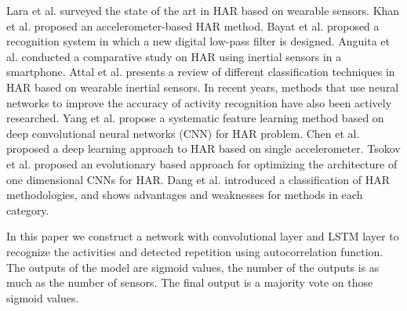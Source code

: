 \documentclass[graybox]{svmult}
\begin{document}
Lara et al.\cite{lara2012survey} surveyed  the state of the art in HAR based on wearable sensors.
Khan et al.\cite{khan2010triaxial} proposed an accelerometer-based HAR method.
Bayat et al.\cite{bayat2014study} proposed a recognition system in which a new digital low-pass filter is designed.
Anguita et al.\cite{anguita2012human} conducted a comparative study on HAR using inertial sensors in a smartphone.
Attal et al.\cite{attal2015physical} presents a review of different classification techniques in HAR based on wearable inertial sensors.
% 
In recent years, methods that use neural networks to improve the accuracy of activity recognition have also been actively researched.
Yang et al.\cite{yang2015deep} propose a systematic feature learning method based on deep convolutional neural networks (CNN) for HAR problem.
Chen et al.\cite{chen2015deep} proposed a deep learning approach to HAR based on single accelerometer. 
Tsokov et al.\cite{tsokov2021evolutionary} proposed an evolutionary based approach for optimizing the architecture of one dimensional CNNs for HAR.
Dang et al.\cite{dang2020sensor} introduced a classification of HAR methodologies, and shows advantages and weaknesses for methods in each category.

In this paper we construct a network with convolutional layer and LSTM layer to recognize the activities and detected repetition using autocorrelation function. The outputs of the model are sigmoid values, the number of the outputs is as much as the number of sensors. The final output is a majority vote on those sigmoid values.
%
\end{document}
